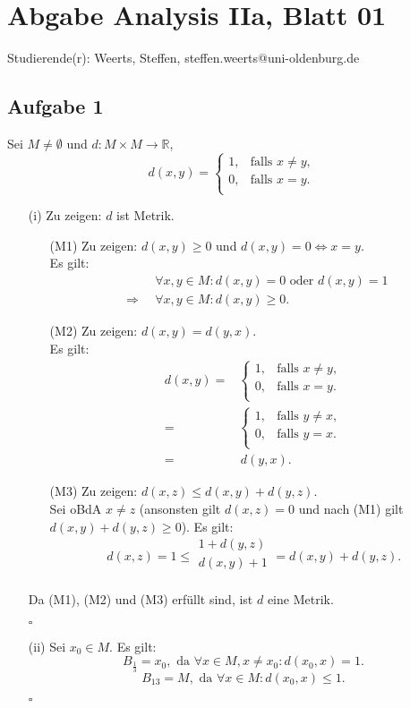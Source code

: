\documentclass[12pt]{article}
\newcommand{\QED}{\begin{flushright} $\square$ \end{flushright}}
\newcommand{\df}{\enspace\Longrightarrow\enspace}
\newcommand{\gdw}{\Leftrightarrow}
\newcommand{\klamm}[4]{\left\{\begin{array}{cc} 
                #1,&\text{falls }#2, \\
                #3,&\text{falls }#4. \\
                \end{array} \right.}
\begin{document}
\section*{Abgabe Analysis IIa, Blatt 01}

Studierende(r): Weerts, Steffen, steffen.weerts@uni-oldenburg.de

\subsection*{Aufgabe 1}
 Sei $M\neq\emptyset$ und $d:M\times M\rightarrow\mathbb{R}$,
	$$d(x,y)=\klamm{1}{x\neq y}{0}{x=y}$$
\begin{enumerate}
	\item[(i)] Zu zeigen: $d$ ist Metrik.
	\begin{enumerate}
		\item[(M1)] Zu zeigen: $d(x,y)\geq0$ und $d(x,y)=0\gdw x=y$. \\
		Es gilt:
		\begin{align*}
			&\forall x,y\in M:d(x,y)=0\text{ oder }d(x,y)=1 \\
			\df &\forall x,y\in M:d(x,y)\geq0.
		\end{align*}
		
		\item[(M2)] Zu zeigen: $d(x,y)=d(y,x)$. \\
		Es gilt:
		\begin{align*}
			d(x,y)=&\klamm{1}{x\neq y}{0}{x=y} \\
			=&\klamm{1}{y\neq x}{0}{y=x} \\
			=&\,d(y,x).
		\end{align*}
		
		\item[(M3)] Zu zeigen: $d(x,z)\leq d(x,y)+d(y,z)$. \\
		Sei oBdA $x\neq z$ (ansonsten gilt $d(x,z)=0$ und nach (M1) gilt $d(x,y)+d(y,z)\geq0$). Es gilt:
		$$d(x,z)=1\leq \begin{array}{cc}1+d(y,z)\\d(x,y)+1\\\end{array}=d(x,y)+d(y,z).$$
	\end{enumerate}
	Da (M1), (M2) und (M3) erfüllt sind, ist $d$ eine Metrik.
	\QED
	
	\item[(ii)] Sei $x_0\in M$. Es gilt:
	$$B_{\frac{1}{3}}={x_0},\text{ da }\forall x\in M,x\neq x_0:d(x_0,x)=1.$$
	$$B_{13}=M,\text{ da }\forall x\in M:d(x_0,x)\leq 1.$$
	\QED
	

\end{enumerate}
\end{document}
